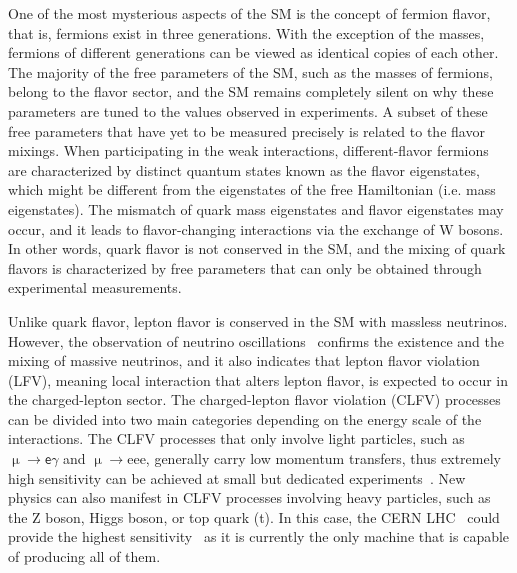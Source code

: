 One of the most mysterious aspects of the \ac{SM} is the concept of fermion flavor, that is, fermions exist in three generations. With the exception of the masses, fermions of different generations can be viewed as identical copies of each other. The majority of the free parameters of the \ac{SM}, such as the masses of fermions, belong to the flavor sector, and the \ac{SM} remains completely silent on why these parameters are tuned to the values observed in experiments. A subset of these free parameters that have yet to be measured precisely is related to the flavor mixings. When participating in the weak interactions, different-flavor fermions are characterized by distinct quantum states known as the flavor eigenstates, which might be different from the eigenstates of the free Hamiltonian (i.e. mass eigenstates). The mismatch of quark mass eigenstates and flavor eigenstates may occur, and it leads to flavor-changing interactions via the exchange of W bosons. In other words, quark flavor is not conserved in the \ac{SM}, and the mixing of quark flavors is characterized by free parameters that can only be obtained through experimental measurements. 

Unlike quark flavor, lepton flavor is conserved in the \ac{SM} with massless neutrinos. However, the observation of neutrino oscillations~\cite{Super-Kamiokande:1998kpq,SNO:2002tuh} confirms the existence and the mixing of massive neutrinos, and it also indicates that lepton flavor violation (LFV), meaning local interaction that alters lepton flavor, is expected to occur in the charged-lepton sector. The charged-lepton flavor violation (\ac{CLFV}) processes can be divided into two main categories depending on the energy scale of the interactions. The \ac{CLFV} processes that only involve light particles, such as $\upmu\rightarrow\textsf{e}\gamma$ and $\upmu\rightarrow$eee, generally carry low momentum transfers, thus extremely high sensitivity can be achieved at small but dedicated experiments~\cite{MEGII:2018kmf,Mu3e:2020gyw}. New physics can also manifest in \ac{CLFV} processes involving heavy particles, such as the Z boson, Higgs boson, or top quark (t). In this case, the \ac{CERN} \ac{LHC}~\cite{Evans:2008zzb} could provide the highest sensitivity~\cite{Davidson:2012wn} as it is currently the only machine that is capable of producing all of them.

